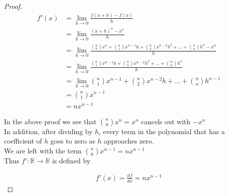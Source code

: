 \documentclass{article}
\begin{document}
\begin{proof}
\begin{align*}
f'(x) &= \lim_{h \to 0} \frac{\displaystyle f(x+h) - f(x)}{\displaystyle h} \\
&= \lim_{h \to 0} \frac{\displaystyle (x+h)^n - x^n}{\displaystyle h} \\
&= \lim_{h \to 0} \frac{\displaystyle \binom{n}{0} x^{n} + \binom{n}{1} x^{n-1} h + \binom{n}{2} x^{n-2} h^2 + ... + \binom{n}{n} h^n - x^n}{\displaystyle h} \\
&= \lim_{h \to 0} \frac{\displaystyle \binom{n}{1} x^{n-1} h + \binom{n}{2} x^{n-2} h^2 + ... + \binom{n}{n} h^n}{\displaystyle h} \\
&= \lim_{h \to 0} \binom{n}{1} x^{n-1} + \binom{n}{2} x^{n-2} h + ... + \binom{n}{n} h^{n-1} \\
&= \binom{n}{1} x^{n-1} \\
&= nx^{n-1}
\end{align*}

In the above proof we see that $\displaystyle \binom{n}{0} x^{n} = x^{n}$ cancels out with $-x^{n}$ \\

In addition, after dividing by $h$, every term in the polynomial that has a coefficient of $h$ goes to zero as $h$ approaches zero. \\

We are left with the term $\displaystyle \binom{n}{0} x^{n-1} = nx^{n-1}$ \\

Thus $f' : \mathbb{R} \to \mathbb{R}$ is defined by

\begin{align*}
f'(x) = \frac{df}{dx} = nx^{n-1}
\end{align*}

\end{proof}
\end{document}
